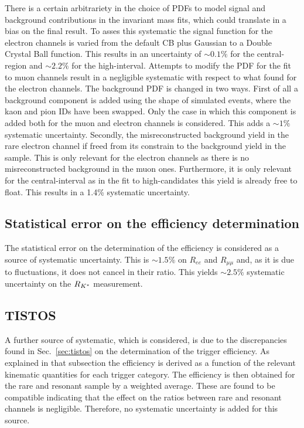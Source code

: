 There is a certain arbitrariety in the choice of PDFs to model signal
and background contributions in the invariant mass fits, which could translate
in a bias on the final result. To asses this systematic the signal function
for the electron channels is varied from the default CB plus Gaussian to a Double Crystal
Ball function. This results in 
an uncertainty of $\sim0.1\%$ for the central-\qsq region and $\sim2.2\%$ for the high-\qsq interval.
Attempts to modify the PDF for the fit to muon channels result in a negligible systematic
with respect to what found for the electron channels.
The background PDF is changed in two ways. First of all a background component
is added using the shape of simulated events, where the kaon and pion IDs have been swapped.
Only the case in which this component is added both for the muon and electron channels is considered.
This adds a $\sim 1\%$ systematic uncertainty. Secondly, the misreconstructed background yield
in the rare electron channel if freed from its constrain to the background yield in the \jpsi sample.
This is only relevant for the electron channels as there is no misreconstructed
background in the muon ones. Furthermore, it is only relevant for the central-\qsq interval
as in the fit to high-\qsq candidates this yield is already free to float.
This results in a 1.4\% systematic uncertainty.

\subsection{Statistical error on the efficiency determination}

The statistical error on the determination of the efficiency is
considered as a source of systematic uncertainty. This is 
$\sim 1.5\%$ on $R_{ee}$ and $R_{\mu\mu}$ and, as it is due to fluctuations,
it does not cancel in their ratio. This yields $\sim2.5\%$ systematic uncertainty
on the $R_{{{K}^*}}$ measurement.


\subsection{TISTOS}

A further source of systematic, which is considered, is due to the
discrepancies found in Sec.~\ref{sec:tistos} on the determination of the trigger efficiency. 
As explained in that subsection the efficiency is derived as a function of the relevant
kinematic quantities for each trigger category. The efficiency
is then obtained for the rare and resonant sample by a weighted average.
These are found to be compatible indicating that the effect on the
ratios between rare and resonant channels is negligible.
Therefore, no systematic uncertainty is added for this source.


